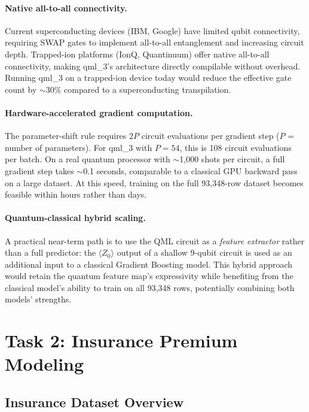 \documentclass[11pt,a4paper]{article}
\begin{document}
\paragraph{Native all-to-all connectivity.}
Current superconducting devices (IBM, Google) have limited qubit connectivity,
requiring SWAP gates to implement all-to-all entanglement and increasing circuit
depth. Trapped-ion platforms (IonQ, Quantinuum) offer native all-to-all
connectivity, making qml\_3's architecture directly compilable without overhead.
Running qml\_3 on a trapped-ion device today would reduce the effective gate
count by $\sim$30\% compared to a superconducting transpilation.

\paragraph{Hardware-accelerated gradient computation.}
The parameter-shift rule requires $2P$ circuit evaluations per gradient step
($P$ = number of parameters). For qml\_3 with $P = 54$, this is 108 circuit
evaluations per batch. On a real quantum processor with $\sim$1,000 shots per
circuit, a full gradient step takes $\sim$0.1 seconds, comparable to a
classical GPU backward pass on a large dataset. At this speed, training on
the full 93,348-row dataset becomes feasible within hours rather than days.

\paragraph{Quantum-classical hybrid scaling.}
A practical near-term path is to use the QML circuit as a \emph{feature
extractor} rather than a full predictor: the $\langle Z_0 \rangle$ output
of a shallow 9-qubit circuit is used as an additional input to a classical
Gradient Boosting model. This hybrid approach would retain the quantum feature
map's expressivity while benefiting from the classical model's ability to train
on all 93,348 rows, potentially combining both models' strengths.

\section{Task 2: Insurance Premium Modeling}
\label{sec:task2}

\subsection{Insurance Dataset Overview}
\end{document}
